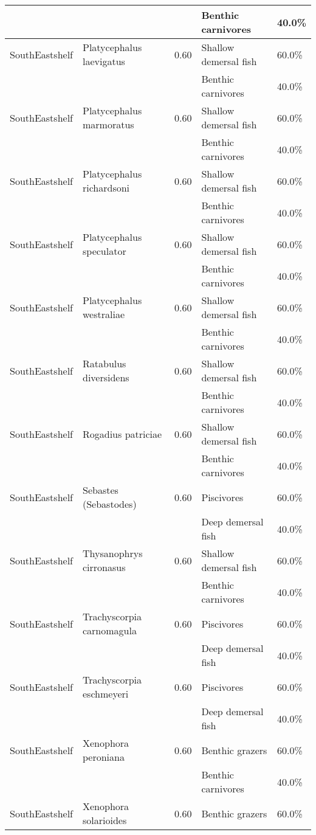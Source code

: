 \begin{longtable}{llcll}
& & & Benthic carnivores & 40.0\% \\
\hline
SouthEastshelf & Platycephalus laevigatus & 0.60 & Shallow demersal fish & 60.0\% \\
& & & Benthic carnivores & 40.0\% \\
\hline
SouthEastshelf & Platycephalus marmoratus & 0.60 & Shallow demersal fish & 60.0\% \\
& & & Benthic carnivores & 40.0\% \\
\hline
SouthEastshelf & Platycephalus richardsoni & 0.60 & Shallow demersal fish & 60.0\% \\
& & & Benthic carnivores & 40.0\% \\
\hline
SouthEastshelf & Platycephalus speculator & 0.60 & Shallow demersal fish & 60.0\% \\
& & & Benthic carnivores & 40.0\% \\
\hline
SouthEastshelf & Platycephalus westraliae & 0.60 & Shallow demersal fish & 60.0\% \\
& & & Benthic carnivores & 40.0\% \\
\hline
SouthEastshelf & Ratabulus diversidens & 0.60 & Shallow demersal fish & 60.0\% \\
& & & Benthic carnivores & 40.0\% \\
\hline
SouthEastshelf & Rogadius patriciae & 0.60 & Shallow demersal fish & 60.0\% \\
& & & Benthic carnivores & 40.0\% \\
\hline
SouthEastshelf & Sebastes (Sebastodes) & 0.60 & Piscivores & 60.0\% \\
& & & Deep demersal fish & 40.0\% \\
\hline
SouthEastshelf & Thysanophrys cirronasus & 0.60 & Shallow demersal fish & 60.0\% \\
& & & Benthic carnivores & 40.0\% \\
\hline
SouthEastshelf & Trachyscorpia carnomagula & 0.60 & Piscivores & 60.0\% \\
& & & Deep demersal fish & 40.0\% \\
\hline
SouthEastshelf & Trachyscorpia eschmeyeri & 0.60 & Piscivores & 60.0\% \\
& & & Deep demersal fish & 40.0\% \\
\hline
SouthEastshelf & Xenophora peroniana & 0.60 & Benthic grazers & 60.0\% \\
& & & Benthic carnivores & 40.0\% \\
\hline
SouthEastshelf & Xenophora solarioides & 0.60 & Benthic grazers & 60.0\% \\

\end{longtable}

